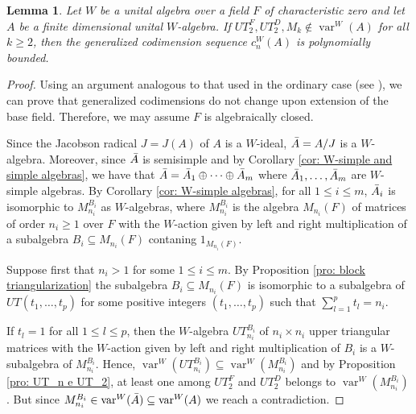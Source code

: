 \documentclass[reqno]{amsart}
\newtheorem{lemma}[theorem]{Lemma}
\theoremstyle{definition}
\numberwithin{equation}{section}
\numberwithin{theorem}{section}
\DeclareMathOperator{\V}{var}
\begin{document}
\begin{lemma}\label{lem:unital W-algebra PG}
    Let $W$ be a unital algebra over a field $F$ of characteristic zero and let
    $A$ be a finite dimensional unital $W$-algebra. 
    If $UT_2^F, UT_2^D, M_k  \notin \V^W(A)$ for all $k\geq 2$, then the generalized codimension sequence $c_n^W(A)$ is polynomially bounded.
\end{lemma}
\begin{proof}
    Using an argument analogous to that used in the ordinary case (see \cite[Theorem 4.1.9]{GZbook}), we can prove that generalized codimensions do not change upon extension of the base field. Therefore, we may assume $F$ is algebraically closed. 
    
    Since the Jacobson radical $J=J(A)$ of $A$ is a $W$-ideal,  $\Bar{A}= A/J$ is a $W$-algebra. Moreover, since $\Bar{A}$ is semisimple and by Corollary \ref{cor: W-simple and simple algebras}, we have that
    $\Bar{A}=\Bar{A}_1 \oplus \cdots \oplus \Bar{A}_m$
    where $\Bar{A}_1, \ldots , \Bar{A}_m$ are $W$-simple algebras.  By Corollary \ref{cor: W-simple algebras}, for all $1\leq i \leq m$, $\Bar{A}_i$ is isomorphic to $M_{n_i}^{B_i}$ as $W$-algebras, where $M_{n_i}^{B_i}$ is the algebra $M_{n_i}(F)$ of matrices of order $n_i\geq 1$ over $F$  with the $W$-action given by left and right multiplication of a subalgebra $B_i\subseteq M_{n_i}(F)$ contaning $1_{M_{n_i}(F)}$. 

  
    Suppose first that $n_i>1$ for some $1\leq i\leq m$. By Proposition \ref{pro: block triangularization} the subalgebra $B_i\subseteq M_{n_i}(F)$ is isomorphic to a subalgebra of $UT(t_1,\ldots,t_p)$
for some positive integers $(t_1,\ldots,t_p)$ such that $\sum_{l=1}^p t_l=n_i$.


 If $t_l=1$ for all $1\leq l \leq p$, then the $W$-algebra $UT_{n_i}^{B_i}$ of $n_i\times n_i$ upper triangular matrices with the $W$-action given by left and right multiplication of $B_i$ is a $W$-subalgebra of $M_{n_i}^{B_i}$. Hence, $\V^W(UT_{n_i}^{B_i})\subseteq\V^W(M_{n_i}^{B_i})$ and by Proposition \ref{pro: UT_n e UT_2}, at least one among $UT_2^F$ and $UT_2^D$ belongs to $\V^W(M_{n_i}^{B_i})$. But since $M_{n_i}^{B_i}\in \V^W(\Bar{A})\subseteq \V^W(A)$ we reach a contradiction.


\end{proof}
\end{document}
